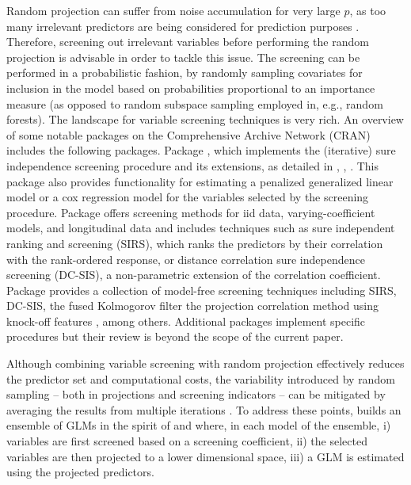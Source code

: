 \documentclass[
  article]{jss}
\begin{document}
Random projection can suffer from noise accumulation for very large
\(p\), as too many irrelevant predictors are being considered for
prediction purposes \citep{Dunson2020TargRandProj}. Therefore, screening
out irrelevant variables before performing the random projection is
advisable in order to tackle this issue. The screening can be performed
in a probabilistic fashion, by randomly sampling covariates for
inclusion in the model based on probabilities proportional to an
importance measure (as opposed to random subspace sampling employed in,
e.g., random forests). The  landscape for variable screening
techniques is very rich. An overview of some notable packages on the
Comprehensive  Archive Network (CRAN) includes the following
packages. Package  \citep{SISR}, which implements the
(iterative) sure independence screening procedure and its extensions, as
detailed in \citet{Fan2007SISforUHD}, \citet{Fan2010sisglms},
\citet{fan2010high}. This package also provides functionality for
estimating a penalized generalized linear model or a cox regression
model for the variables selected by the screening procedure. Package
 \citep{pkg:VariableScreening} offers screening
methods for iid data, varying-coefficient models, and longitudinal data
and includes techniques such as sure independent ranking and screening
(SIRS), which ranks the predictors by their correlation with the
rank-ordered response, or distance correlation sure independence
screening (DC-SIS), a non-parametric extension of the correlation
coefficient. Package  \citep{pkg:MFSIS} provides a collection
of model-free screening techniques including SIRS, DC-SIS, the fused
Kolmogorov filter \citep{mai2015fusedkolmogorov} the projection
correlation method using knock-off features \citep{liu2020knockoff},
among others. Additional packages implement specific procedures but
their review is beyond the scope of the current paper.

Although combining variable screening with random projection effectively
reduces the predictor set and computational costs, the variability
introduced by random sampling -- both in projections and screening
indicators -- can be mitigated by averaging the results from multiple
iterations \citep{Thanei2017RPforHDR}. To address these points,
 builds an ensemble of GLMs in the spirit of
\citet{Dunson2020TargRandProj} and \citet{parzer2024glms} where, in each
model of the ensemble, i) variables are first screened based on a
screening coefficient, ii) the selected variables are then projected to
a lower dimensional space, iii) a GLM is estimated using the projected
predictors.
\end{document}
